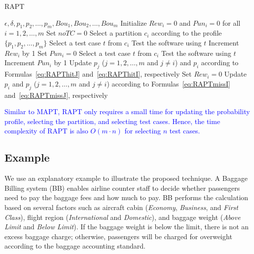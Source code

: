 \documentclass[10pt,journal,compsoc]{IEEEtran}
\begin{document}
\begin{algorithm}
	\caption{RAPT}
	\label{alg:RAPT}
	\begin{algorithmic}[1]
		\renewcommand{\algorithmicrequire}{\textbf{Input:}}
		\renewcommand{\algorithmicensure}{\textbf{Output:}}
		\renewcommand{\algorithmicendwhile}{\algorithmicend\_\algorithmicwhile}
		\renewcommand{\algorithmicendfor}{\algorithmicend\_\algorithmicfor}
		\renewcommand{\algorithmicendif}{\algorithmicend\_\algorithmicif}
		\renewcommand{\algorithmicthen}{}
		\renewcommand{\algorithmicdo}{}
		\REQUIRE $\epsilon, \delta, p_1, p_2, \ldots, p_m, Bou_1, Bou_2, \ldots, Bou_m$
		\STATE Initialize $Rew_i = 0$ and $Pun_i = 0$ for all $i = 1, 2, \ldots, m$
		\STATE Set $noTC = 0$
		\STATE Select a partition $c_i$ according to the profile $\{p_1, p_2, \ldots, p_m\}$
		\STATE Select a test case $t$ from $c_i$
		\STATE Test the software using $t$
		\STATE Increment $Rew_i$ by 1
		\STATE Set $Pun_i = 0$
		\STATE Select a test case $t$ from $c_i$
		\STATE Test the software using $t$
		\ENDWHILE
		\STATE Increment $Pun_i$ by 1
		\STATE Update $p_j$ ($j = 1, 2, \ldots, m$ and $j \neq i$) and $p_i$ according to Formulas~\ref{eq:RAPThitJ} and~\ref{eq:RAPThitI}, respectively
		\STATE Set $Rew_i = 0$
		\ELSE
		\STATE Update $p_i$ and $p_j$ ($j = 1, 2, \ldots, m$ and $j \neq i$) according to Formulas~\ref{eq:RAPTmissI} and~\ref{eq:RAPTmissJ}, respectively
		\ENDIF
		\ENDWHILE
	\end{algorithmic}
\end{algorithm}


\textcolor{blue}{
Similar to MAPT, RAPT only requires a small time for updating the probability profile, selecting the partition, and selecting test cases. Hence, the time complexity of RAPT is also $O(m \cdot n)$ for selecting $n$ test cases.}

\subsection{Example}
We use an explanatory example to illustrate the proposed technique. A Baggage Billing system (BB) enables airline counter staff to decide whether passengers need to pay the baggage fees and how much to pay. BB performs the calculation based on several factors such as aircraft cabin (\emph{Economy}, \emph{Business}, and \emph{First Class}), flight region (\emph{International} and \emph{Domestic}), and baggage weight (\emph{Above Limit} and \emph{Below Limit}). If the baggage weight is below the limit, there is not an excess baggage charge; otherwise, passengers will be charged for overweight according to the baggage accounting standard.
\end{document}
